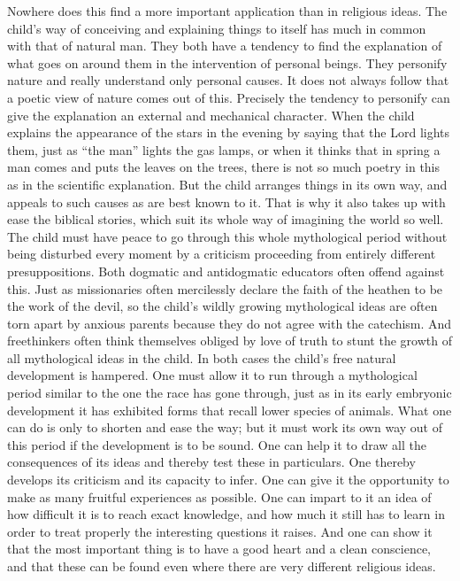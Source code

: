\documentclass[12pt,a4paper,openany]{book}
\newcommand{\opage}[1]{\marginnote{\footnotesize\textit{[#1]}}}
\begin{document}
Nowhere does this find a more important application than in religious ideas. The child's way of conceiving and
explaining things to itself has much in common with that of natural man. They both have a tendency to find the
explanation of what goes on around them in the intervention of personal beings. They personify nature and really
understand only personal causes. It does not always follow that a poetic view of nature comes out of this. Precisely the
tendency to personify can give the explanation an external and mechanical character. When the child explains the
appearance of the stars in the evening by saying that the Lord lights them, just as ``the man'' lights the gas lamps, or
when it thinks that in spring a man comes and puts the leaves on the trees, there is not so much poetry in this as in
the scientific explanation. But the child arranges things in its own way, and appeals to such causes as are best known
to it. That is why it also takes up with ease the biblical stories, which suit its whole way of imagining the world so
well. The child must have peace to go through this whole mythological period without being disturbed every moment by a
criticism proceeding from entirely different presuppositions. Both dogmatic and antidogmatic educators often offend
against this. Just as missionaries often mercilessly declare the faith of the heathen to be the work of the devil, so
the child's wildly growing mythological ideas are often torn apart by anxious parents because they do not agree with the
catechism. And freethinkers often think themselves obliged by love of truth to stunt the growth of all mythological ideas
in the child. In both cases the child's free natural development is hampered. One must allow it to run through a
mythological period similar to the one the race has gone through, just as in its early embryonic development it has
exhibited forms that recall lower species of animals. What one can do is only to shorten and ease the way; but it must
\opage{337}work its own way out of this period if the development is to be sound. One can help it to draw all the
consequences of its ideas and thereby test these in particulars. One thereby develops its criticism and its capacity to
infer. One can give it the opportunity to make as many fruitful experiences as possible. One can impart to it an idea of
how difficult it is to reach exact knowledge, and how much it still has to learn in order to treat properly the
interesting questions it raises. And one can show it that the most important thing is to have a good heart and a clean
conscience, and that these can be found even where there are very different religious ideas.
\end{document}
